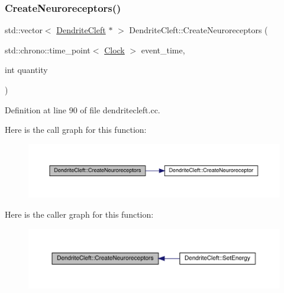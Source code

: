 \subsubsection{\texorpdfstring{Create\+Neuroreceptors()}{CreateNeuroreceptors()}}
{\footnotesize\ttfamily std\+::vector$<$ \hyperlink{class_dendrite_cleft}{Dendrite\+Cleft} $\ast$ $>$ Dendrite\+Cleft\+::\+Create\+Neuroreceptors (\begin{DoxyParamCaption}\item[{std\+::chrono\+::time\+\_\+point$<$ \hyperlink{universe_8h_a0ef8d951d1ca5ab3cfaf7ab4c7a6fd80}{Clock} $>$}]{event\+\_\+time,  }\item[{int}]{quantity }\end{DoxyParamCaption})}



Definition at line 90 of file dendritecleft.\+cc.

Here is the call graph for this function\+:\nopagebreak
\begin{figure}[H]
\begin{center}
\leavevmode
\includegraphics[width=350pt]{class_dendrite_cleft_ab34af5363b25c6498aee429725a1c7db_cgraph}
\end{center}
\end{figure}
Here is the caller graph for this function\+:\nopagebreak
\begin{figure}[H]
\begin{center}
\leavevmode
\includegraphics[width=350pt]{class_dendrite_cleft_ab34af5363b25c6498aee429725a1c7db_icgraph}
\end{center}
\end{figure}
\mbox{\label{class_dendrite_cleft_a86e9943d9d140c2a06d7e222812c9548}} 
